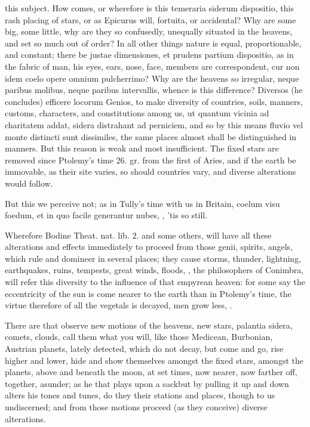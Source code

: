 {this subject. How comes, or wherefore is this temeraria siderum
dispositio, this rash placing of stars, or as Epicurus will, fortuita,
or accidental? Why are some big, some little, why are they so
confusedly, unequally situated in the heavens, and set so much out of
order? In all other things nature is equal, proportionable, and
constant; there be justae dimensiones, et prudens partium dispositio,
as in the fabric of man, his eyes, ears, nose, face, members are
correspondent, cur non idem coelo opere omnium pulcherrimo? Why are the
heavens so irregular, neque paribus molibus, neque paribus intervallis,
whence is this difference? Diversos (he concludes) efficere locorum
Genios, to make diversity of countries, soils, manners, customs,
characters, and constitutions among us, ut quantum vicinia ad
charitatem addat, sidera distrahant ad perniciem, and so by this means
fluvio vel monte distincti sunt dissimiles, the same places almost
shall be distinguished in manners. But this reason is weak and most
insufficient. The fixed stars are removed since Ptolemy's time 26. gr.
from the first of Aries, and if the earth be immovable, as their site
varies, so should countries vary, and diverse alterations would follow.

But this we perceive not; as in Tully's time with us in Britain, coelum
visu foedum, et in quo facile generantur nubes, \etc{}, 'tis so still.

Wherefore Bodine Theat. nat. lib. 2. and some others, will have all
these alterations and effects immediately to proceed from those genii,
spirits, angels, which rule and domineer in several places; they cause
storms, thunder, lightning, earthquakes, ruins, tempests, great winds,
floods, \etc{}, the philosophers of Conimbra, will refer this diversity to
the influence of that empyrean heaven: for some say the eccentricity of
the sun is come nearer to the earth than in Ptolemy's time, the virtue
therefore of all the vegetals is decayed, men grow less, \etc{}.

There are that observe new motions of the heavens, new stars, palantia
sidera, comets, clouds, call them what you will, like those Medicean,
Burbonian, Austrian planets, lately detected, which do not decay, but
come and go, rise higher and lower, hide and show themselves amongst
the fixed stars, amongst the planets, above and beneath the moon, at
set times, now nearer, now farther off, together, asunder; as he that
plays upon a sackbut by pulling it up and down alters his tones and
tunes, do they their stations and places, though to us undiscerned; and
from those motions proceed (as they conceive) diverse alterations.

}
